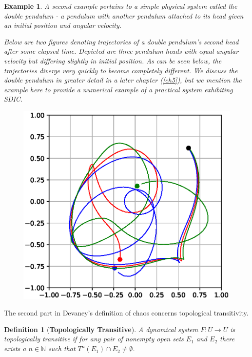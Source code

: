 \documentclass[a4paper,12pt,twoside]{report}
\newtheorem{Definition}{Definition}[]
\newtheorem{Example}{Example}[]
\begin{document}
\begin{Example} \rm
  A second example pertains to a simple physical system called the double pendulum - a pendulum with another pendulum attached to its head given an initial position and angular velocity.
  
  Below are two figures denoting trajectories of a double pendulum's second head after some elapsed time. Depicted are three pendulum heads with equal angular velocity but differing slightly in initial position. As can be seen below, the trajectories diverge very quickly to become completely different. We discuss the double pendulum in greater detail in a later chapter (\ref{ch5}), but we mention the example here to provide a numerical example of a practical system exhibiting SDIC.

\begin{figure}[ht]
  \centering
\includegraphics[scale=0.8]{_dp_sdic.eps}
    \label{fig:dp_sdic}
  \end{figure}

\end{Example}


The second part in Devaney's definition of chaos concerns topological transitivity.

\begin{Definition}
  [\bf {Topologically Transitive}]\label{Dfn_TopolTrans}\rm
	A dynamical system $F: U \to U$ is topologically transitive if for any pair of nonempty open sets $E_1$ and $E_2$ there exists a $n\in\mathbb{N}$ such that $T^n(E_1) \cap E_2 \not= \emptyset$. 
\end{Definition}
\end{document}
